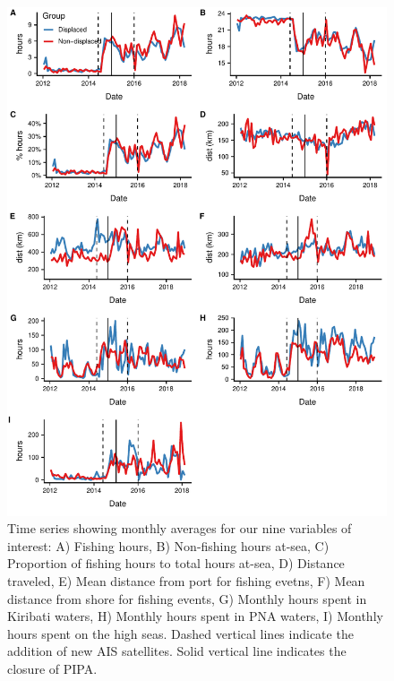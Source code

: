 \documentclass[9p,twocolumn,twoside,lineno]{pnas-new}
\begin{document}


\begin{figure}[H]
\centering
\includegraphics{img/all_panels.pdf}
\caption{\label{fig:all_panels}Time series showing monthly averages for our nine variables of interest: A) Fishing hours, B) Non-fishing hours at-sea, C) Proportion of fishing hours to total hours at-sea, D) Distance traveled, E) Mean distance from port for fishing evetns, F) Mean distance from shore for fishing events, G) Monthly hours spent in Kiribati waters, H) Monthly hours spent in PNA waters, I) Monthly hours spent on the high seas. Dashed vertical lines indicate the addition of new AIS satellites. Solid vertical line indicates the closure of PIPA.}
\end{figure}
\end{document}
